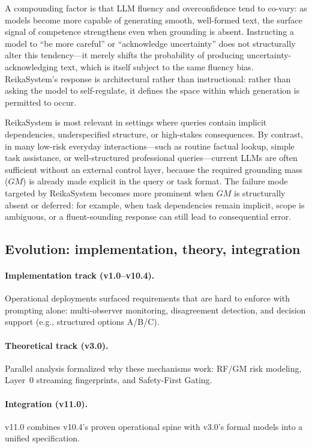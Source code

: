 \documentclass[11pt,a4paper]{article}
\begin{document}
A compounding factor is that LLM fluency and overconfidence tend to co-vary: as models become
more capable of generating smooth, well-formed text, the surface signal of competence strengthens
even when grounding is absent. Instructing a model to ``be more careful'' or ``acknowledge
uncertainty'' does not structurally alter this tendency---it merely shifts the probability of
producing uncertainty-acknowledging text, which is itself subject to the same fluency bias.
ReikaSystem's response is architectural rather than instructional: rather than asking the model
to self-regulate, it defines the space within which generation is permitted to occur.

ReikaSystem is most relevant in settings where queries contain implicit dependencies,
underspecified structure, or high-stakes consequences.
By contrast, in many low-risk everyday interactions---such as routine factual lookup,
simple task assistance, or well-structured professional queries---current LLMs are often
sufficient without an external control layer, because the required grounding mass ($GM$)
is already made explicit in the query or task format.
The failure mode targeted by ReikaSystem becomes more prominent when $GM$ is structurally
absent or deferred: for example, when task dependencies remain implicit, scope is ambiguous,
or a fluent-sounding response can still lead to consequential error.

\subsection{Evolution: implementation, theory, integration}

\paragraph{Implementation track (v1.0--v10.4).}
Operational deployments surfaced requirements that are hard to enforce with prompting alone:
multi-observer monitoring, disagreement detection, and decision support (e.g., structured
options A/B/C).

\paragraph{Theoretical track (v3.0).}
Parallel analysis formalized why these mechanisms work: RF/GM risk modeling, Layer~0
streaming fingerprints, and Safety-First Gating.

\paragraph{Integration (v11.0).}
v11.0 combines v10.4's proven operational spine with v3.0's formal models into a unified
specification.
\end{document}
